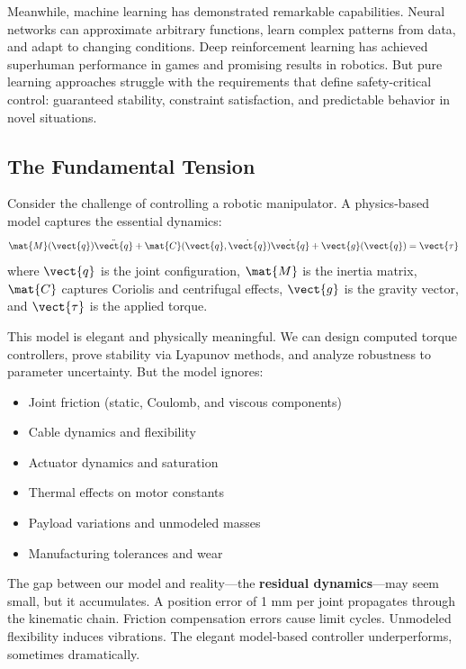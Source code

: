 Meanwhile, machine learning has demonstrated remarkable capabilities. Neural networks can approximate arbitrary functions, learn complex patterns from data, and adapt to changing conditions. Deep reinforcement learning has achieved superhuman performance in games and promising results in robotics. But pure learning approaches struggle with the requirements that define safety-critical control: guaranteed stability, constraint satisfaction, and predictable behavior in novel situations.

\subsection{The Fundamental Tension}

Consider the challenge of controlling a robotic manipulator. A physics-based model captures the essential dynamics:
\begin{equation}
\mat{M}(\vect{q})\ddot{\vect{q}} + \mat{C}(\vect{q}, \dot{\vect{q}})\dot{\vect{q}} + \vect{g}(\vect{q}) = \vect{\tau}
\label{eq:manipulator_dynamics}
\end{equation}
where $\vect{q}$ is the joint configuration, $\mat{M}$ is the inertia matrix, $\mat{C}$ captures Coriolis and centrifugal effects, $\vect{g}$ is the gravity vector, and $\vect{\tau}$ is the applied torque.

This model is elegant and physically meaningful. We can design computed torque controllers, prove stability via Lyapunov methods, and analyze robustness to parameter uncertainty. But the model ignores:
\begin{itemize}
    \item Joint friction (static, Coulomb, and viscous components)
    \item Cable dynamics and flexibility
    \item Actuator dynamics and saturation
    \item Thermal effects on motor constants
    \item Payload variations and unmodeled masses
    \item Manufacturing tolerances and wear
\end{itemize}

The gap between our model and reality---the \textbf{residual dynamics}---may seem small, but it accumulates. A position error of 1 mm per joint propagates through the kinematic chain. Friction compensation errors cause limit cycles. Unmodeled flexibility induces vibrations. The elegant model-based controller underperforms, sometimes dramatically.

